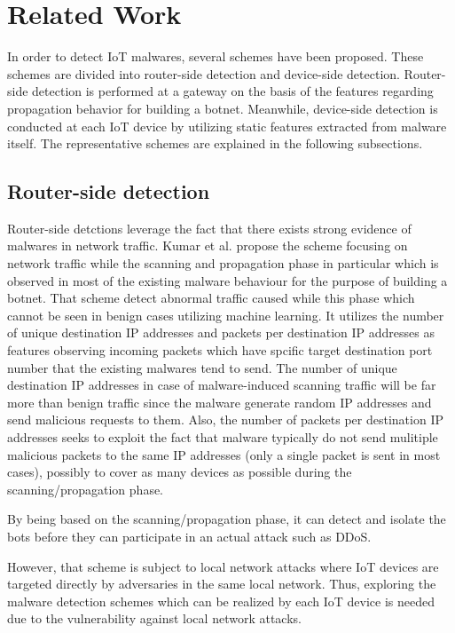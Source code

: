 \chapter{Related Work}\label{sec:related_work} 
In order to detect IoT malwares, several schemes have been proposed. 
These schemes are divided into router-side detection and device-side detection.
Router-side detection is performed at a gateway on the basis of the features regarding propagation behavior for building a botnet.
Meanwhile, device-side detection is conducted at each IoT device by utilizing static features extracted from malware itself.
The representative schemes are explained in the following subsections.

\section{Router-side detection}
Router-side detctions leverage the fact that there exists strong evidence of malwares in network traffic.
Kumar et al. \cite{router} propose the scheme focusing on network traffic while the scanning and propagation phase in particular which is observed in most of the existing malware behaviour for the purpose of building a botnet. 
That scheme detect abnormal traffic caused while this phase which cannot be seen in benign cases utilizing machine learning.
It utilizes the number of unique destination IP addresses and packets per destination IP addresses as features observing incoming packets which have spcific target destination port number that the existing malwares tend to send.
The number of unique destination IP addresses in case of malware-induced scanning traffic will be far more than benign traffic since the malware generate random IP addresses and send malicious requests to them.
Also, the number of packets per destination IP addresses seeks to exploit the fact that malware typically do not send mulitiple malicious packets to the same IP addresses (only a single packet is sent in most cases), possibly to cover as many devices as possible during the scanning/propagation phase.

By being based on the scanning/propagation phase, it can detect and isolate the bots before they can participate in an actual attack such as DDoS.

However, that scheme is subject to local network attacks where IoT devices are targeted directly by adversaries in the same local network.
Thus, exploring the malware detection schemes which can be realized by each IoT device is needed due to the vulnerability against local network attacks.

